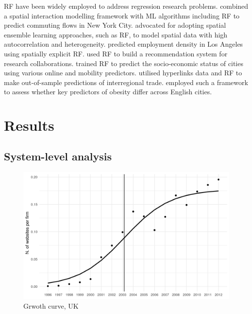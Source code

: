 \documentclass[
  authoryear,
  preprint,
  3p]{elsarticle}
\begin{document}
RF have been widely employed to address regression research problems.
\citet{pourebrahim2019trip} combined a spatial interaction modelling
framework with ML algorithms including RF to predict commuting flows in
New York City. \citet{sinha2019assessing} advocated for adopting spatial
ensemble learning approaches, such as RF, to model spatial data with
high autocorrelation and heterogeneity. \citet{creditspatial} predicted
employment density in Los Angeles using spatially explicit RF.
\citet{guns2014recommending} used RF to build a recommendation system
for research collaborations. \citet{ren2019predicting} trained RF to
predict the socio-economic status of cities using various online and
mobility predictors. \citet{tranos2023using} utilised hyperlinks data
and RF to make out-of-sample predictions of interregional trade.
\citet{zhou2023geography} employed such a framework to assess whether
key predictors of obesity differ across English cities.

\section{Results}\label{sec-results}

\subsection{System-level analysis}\label{system-level-analysis}

\begin{figure}[H]

{\centering \includegraphics[width=1\textwidth,height=\textheight]{../../outputs/s/s_uk_per_firm.png}

}

\caption{\label{s_uk}Grwoth curve, UK}

\end{figure}%
\end{document}
